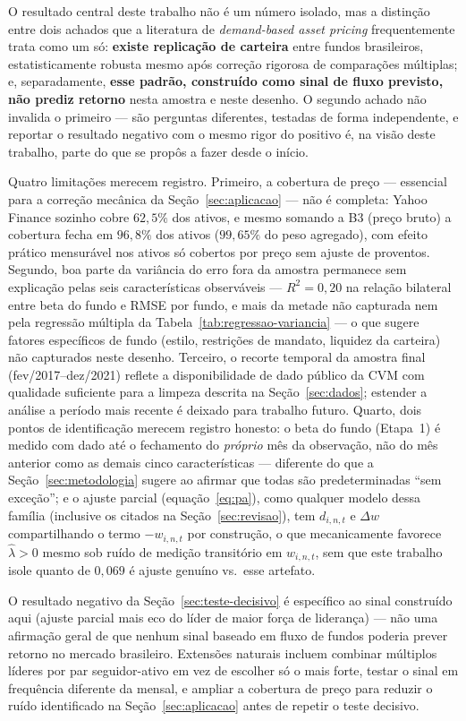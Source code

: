 \documentclass[11pt,a4paper]{article}
\begin{document}
O resultado central deste trabalho não é um número isolado, mas a distinção entre dois achados
que a literatura de \emph{demand-based asset pricing} frequentemente trata como um só:
\textbf{existe replicação de carteira} entre fundos brasileiros, estatisticamente robusta mesmo
após correção rigorosa de comparações múltiplas; e, separadamente, \textbf{esse padrão, construído
como sinal de fluxo previsto, não prediz retorno} nesta amostra e neste desenho. O segundo achado
não invalida o primeiro --- são perguntas diferentes, testadas de forma independente, e reportar o
resultado negativo com o mesmo rigor do positivo é, na visão deste trabalho, parte do que se
propôs a fazer desde o início.

Quatro limitações merecem registro. Primeiro, a cobertura de preço --- essencial para a correção
mecânica da Seção~\ref{sec:aplicacao} --- não é completa: Yahoo Finance sozinho cobre $62{,}5\%$
dos ativos, e mesmo somando a B3 (preço bruto) a cobertura fecha em $96{,}8\%$ dos ativos
($99{,}65\%$ do peso agregado), com efeito prático mensurável nos ativos só cobertos por preço
sem ajuste de proventos. Segundo, boa parte da variância do erro fora da amostra permanece sem
explicação pelas seis características observáveis --- $R^2=0{,}20$ na relação bilateral entre
beta do fundo e RMSE por fundo, e mais da metade não capturada nem pela regressão múltipla da
Tabela~\ref{tab:regressao-variancia} --- o que sugere fatores específicos de fundo (estilo,
restrições de mandato, liquidez da carteira) não capturados neste desenho. Terceiro, o recorte
temporal da amostra final (fev/2017--dez/2021) reflete a disponibilidade de dado público da CVM
com qualidade suficiente para a limpeza descrita na Seção~\ref{sec:dados}; estender a análise a
período mais recente é deixado para trabalho futuro. Quarto, dois pontos de identificação
merecem registro honesto: o beta do fundo (Etapa~1) é medido com dado até o fechamento do
\emph{próprio} mês da observação, não do mês anterior como as demais cinco características ---
diferente do que a Seção~\ref{sec:metodologia} sugere ao afirmar que todas são predeterminadas
``sem exceção''; e o ajuste parcial (equação~\eqref{eq:pa}), como qualquer modelo dessa família
(inclusive os citados na Seção~\ref{sec:revisao}), tem $d_{i,n,t}$ e $\Delta w$ compartilhando o
termo $-w_{i,n,t}$ por construção, o que mecanicamente favorece $\widehat\lambda>0$ mesmo sob
ruído de medição transitório em $w_{i,n,t}$, sem que este trabalho isole quanto de $0{,}069$ é
ajuste genuíno vs.\ esse artefato.

O resultado negativo da Seção~\ref{sec:teste-decisivo} é específico ao sinal construído aqui
(ajuste parcial mais eco do líder de maior força de liderança) --- não uma afirmação geral de que
nenhum sinal baseado em fluxo de fundos poderia prever retorno no mercado brasileiro. Extensões
naturais incluem combinar múltiplos líderes por par seguidor-ativo em vez de escolher só o mais
forte, testar o sinal em frequência diferente da mensal, e ampliar a cobertura de preço para
reduzir o ruído identificado na Seção~\ref{sec:aplicacao} antes de repetir o teste decisivo.


\end{document}
